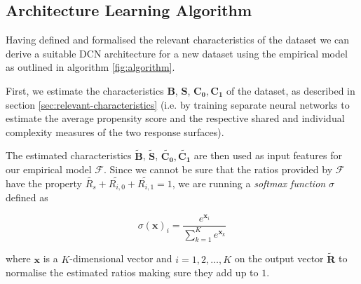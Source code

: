 \subsection{Architecture Learning Algorithm}
Having defined and formalised the relevant characteristics of the dataset we can derive a suitable DCN architecture for a new dataset using the empirical model as outlined in algorithm \ref{fig:algorithm}. 

First, we estimate the characteristics $\mathbf{B}$, $\mathbf{S}$, $\mathbf{C_0}, \mathbf{C_1}$ of the dataset, as described in section  \ref{sec:relevant-characteristics} (i.e. by training separate neural networks to estimate the average propensity score and the respective shared and individual complexity measures of the two response surfaces). 

The estimated characteristics $\tilde{\mathbf{B}}$, $\tilde{\mathbf{S}}$, $\tilde{\mathbf{C_0}}, \tilde{\mathbf{C_1}}$ are then used as input features for our empirical model $\mathcal{F}$. Since we cannot be sure that the ratios provided by $\mathcal{F}$ have the property $\tilde{R_{s}} + \tilde{R_{i,0}} + \tilde{R_{i,1}} = 1 $, we are running a \emph{softmax function} $\sigma$ defined as  

\begin{equation}
\sigma(\mathbf{x})_i = \frac{e^{\mathbf{x}_i}}{\sum_{k=1}^{K}e^{\mathbf{x}_k}}
\end{equation}

where $\mathbf{x}$ is a $K$-dimensional vector and $i = 1, 2, \dots, K$ on the output vector $\tilde{\mathbf{R}}$ to normalise the estimated ratios making sure they add up to $1$. 


